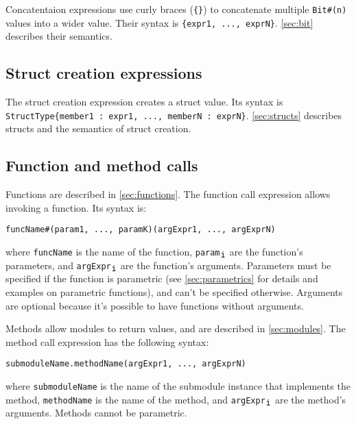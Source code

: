 Concatentaion expressions use curly braces (\verb|{}|) to concatenate multiple \verb|Bit#(n)| values into a wider value.
Their syntax is \verb|{expr1, ..., exprN}|.
\autoref{sec:bit} describes their semantics.

\subsection{Struct creation expressions}
\label{sec:structExpr}

The struct creation expression creates a struct value. Its syntax is
\texttt{StructType\{member1\,:\,expr1, ..., memberN\,:\,exprN\}}.
\autoref{sec:structs} describes structs and the semantics of struct creation.

\subsection{Function and method calls}
\label{sec:calls}

Functions are described in \autoref{sec:functions}. The function call expression allows invoking a function. Its syntax is:
\begin{center}
  \verb|funcName|\tmp{$[$}\verb|#(param1, ..., paramK)|\tmp{$]$}\tmp{$[$}\verb|(argExpr1, ..., argExprN)|\tmp{$]$}
\end{center}
where \verb|funcName| is the name of the function, \verb|param|$_{\verb|i|}$ are the function's parameters,
and \verb|argExpr|$_{\verb|i|}$ are the function's arguments.
Parameters must be specified if the function is parametric (see \autoref{sec:parametrics} for details and examples on parametric functions),
and can't be specified otherwise.
Arguments are optional because it's possible to have functions without arguments. 

Methods allow modules to return values, and are described in \autoref{sec:modules}. The method call expression has the following syntax:
\begin{center}
    \verb|submoduleName.methodName|\tmp{$[$}\verb|(argExpr1, ..., argExprN)|\tmp{$]$}
\end{center}
where \verb|submoduleName| is the name of the submodule instance that implements the method,
\verb|methodName| is the name of the method, and \verb|argExpr|$_{\verb|i|}$ are the method's arguments.
Methods cannot be parametric.
